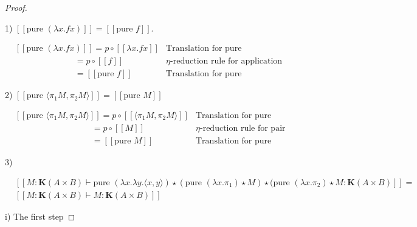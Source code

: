 \documentclass[a4paper]{article}
\begin{document}
\begin{proof}

$ $

1) $[\![\text{pure } (\lambda x. f x)]\!] = [\![\text{pure } f]\!]$.

\vspace{\baselineskip}

$\begin{array}{lll}
&[\![\text{pure } (\lambda x. f x)]\!] = p \circ [\![\lambda x. f x]\!]& \text{Translation for pure} \\
&\quad\quad\quad\quad\quad\quad\quad= p \circ [\![f]\!]& \text{$\eta$-reduction rule for application} \\
&\quad\quad\quad\quad\quad\quad\quad= [\![\text{pure } f ]\!]& \text{Translation for pure}
\end{array}$

\vspace{\baselineskip}

2) $[\![\text{pure } \langle \pi_1 M, \pi_2 M \rangle]\!] = [\![\text{pure } M]\!]$

\vspace{\baselineskip}

$\begin{array}{lll}
&[\![\text{pure } \langle \pi_1 M, \pi_2 M \rangle]\!] = p \circ [\![\langle \pi_1 M, \pi_2 M \rangle]\!]&
\text{Translation for pure} \\
&\quad\quad\quad\quad\quad\quad\quad\quad\quad= p \circ [\![M]\!]& \text{$\eta$-reduction rule for pair} \\
&\quad\quad\quad\quad\quad\quad\quad\quad\quad= [\![\text{pure } M]\!]& \text{Translation for pure}
\end{array}$
\vspace{\baselineskip}

3)

$\begin{array}{lll}
&[\![M : \textbf{K}(A \times B) \vdash \text{pure } (\lambda x. \lambda y. \langle x, y \rangle) \star
(\text{pure } (\lambda x. \pi_1) \star M) \star (\text{pure } (\lambda x. \pi_2) \star M : \textbf{K}(A
\times B)]\!]=&\\
&[\![M : \textbf{K}(A \times B) \vdash M : \textbf{K}(A \times B)]\!]&
\end{array}$

\vspace{\baselineskip}

i) The first step


\end{proof}
\end{document}

